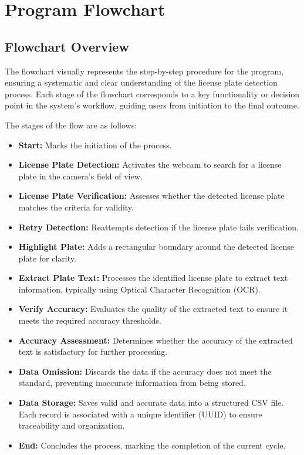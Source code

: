 %
%

\chapter{Program Flowchart}

\section{Flowchart Overview}

The flowchart visually represents the step-by-step procedure for the program, ensuring a systematic and clear understanding of the license plate detection process. Each stage of the flowchart corresponds to a key functionality or decision point in the system's workflow, guiding users from initiation to the final outcome. 

The stages of the flow are as follows:

\begin{itemize}
	\item \textbf{Start:} Marks the initiation of the process.
	\item \textbf{License Plate Detection:} Activates the webcam to search for a license plate in the camera’s field of view.
	\item \textbf{License Plate Verification:} Assesses whether the detected license plate matches the criteria for validity.
	\item \textbf{Retry Detection:} Reattempts detection if the license plate fails verification.
	\item \textbf{Highlight Plate:} Adds a rectangular boundary around the detected license plate for clarity.
	\item \textbf{Extract Plate Text:} Processes the identified license plate to extract text information, typically using Optical Character Recognition (OCR).
	\item \textbf{Verify Accuracy:} Evaluates the quality of the extracted text to ensure it meets the required accuracy thresholds.
	\item \textbf{Accuracy Assessment:} Determines whether the accuracy of the extracted text is satisfactory for further processing.
	\item \textbf{Data Omission:} Discards the data if the accuracy does not meet the standard, preventing inaccurate information from being stored.
	\item \textbf{Data Storage:} Saves valid and accurate data into a structured CSV file. Each record is associated with a unique identifier (UUID) to ensure traceability and organization.
	\item \textbf{End:} Concludes the process, marking the completion of the current cycle.
\end{itemize}

